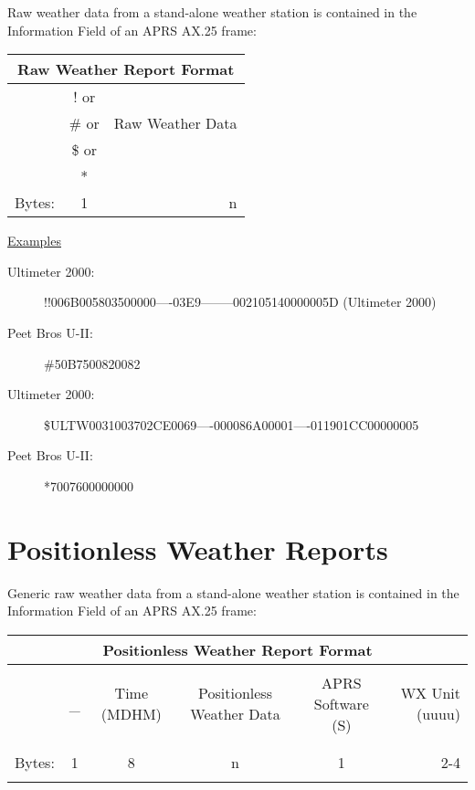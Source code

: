 Raw weather data from a stand-alone weather station is contained in the
Information Field of an APRS AX.25 frame:


\begin{tabular}{|l|c|r|}
  \hline
  \multicolumn{3}{|c|}{Raw Weather Report Format} \\
  \hline
  \hline
  & ! or &  \\
  & \# or  & Raw Weather Data \\
  & \$ or  & \\
  & *  & \\
  \hline 
  Bytes: & 1 & n   \\
  \hline
\end{tabular}



\underline{Examples}
\begin{description}
\item [Ultimeter 2000: ] !!006B005803500000----03E9--------002105140000005D (Ultimeter 2000)
\item [Peet Bros U-II: ] \#50B7500820082   
\item [Ultimeter 2000: ] \$ULTW0031003702CE0069----000086A00001----011901CC00000005   
\item [Peet Bros U-II: ] *7007600000000  
\end{description}


\section{Positionless Weather Reports}

Generic raw weather data from a stand-alone weather station is contained in
the Information Field of an APRS AX.25 frame:


\begin{tabular}{|l|c|c|c|c|r|}
  \hline
  \multicolumn{6}{c}{Positionless Weather Report Format} \\
  \hline
  & & & & &  \\ 
  & \_ & Time (MDHM) & Positionless Weather Data & APRS Software (S) & WX Unit (uuuu) \\
  & & & & &  \\ 
  \hline
  & & & & &  \\ 
  Bytes: & 1 & 8 & n & 1 & 2-4 \\
  & & & & &  \\ 
  \hline
\end{tabular}

